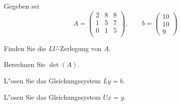 Gegeben sei
\[
A=\begin{pmatrix}
   2&  8&  8\\
   1&  5&  7\\
   0&  1&  5\\
\end{pmatrix},
\qquad
b=\begin{pmatrix}
10\\10\\9
\end{pmatrix}
\]
\begin{teilaufgaben}
\item Finden Sie die $LU$-Zerlegung von $A$.
\item Berechnen Sie $\det(A)$.
\item L"osen Sie das Gleichungssystem $Ly=b$.
\item L"osen Sie das Gleichungssystem $Ux=y$.
\end{teilaufgaben}

